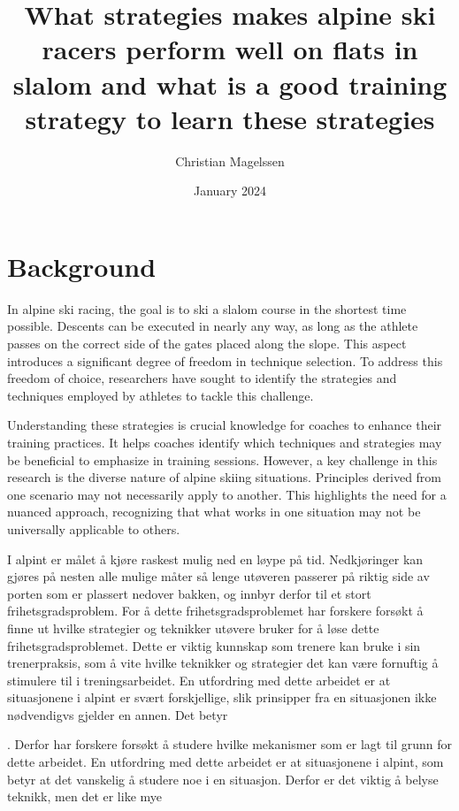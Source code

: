 \documentclass[letterpaper,10pt]{article}
\title{What strategies makes alpine ski racers perform well on flats in slalom and what is a good training strategy to learn these strategies}
\author{Christian Magelssen}
\date{January 2024}
\begin{document}
\maketitle

\section{Background}

In alpine ski racing, the goal is to ski a slalom course in the shortest time possible. Descents can be executed in nearly any way, as long as the athlete passes on the correct side of the gates placed along the slope. This aspect introduces a significant degree of freedom in technique selection. To address this freedom of choice, researchers have sought to identify the strategies and techniques employed by athletes to tackle this challenge.

Understanding these strategies is crucial knowledge for coaches to enhance their training practices. It helps coaches identify which techniques and strategies may be beneficial to emphasize in training sessions. However, a key challenge in this research is the diverse nature of alpine skiing situations. Principles derived from one scenario may not necessarily apply to another. This highlights the need for a nuanced approach, recognizing that what works in one situation may not be universally applicable to others.



I alpint er målet å kjøre raskest mulig ned en løype på tid. Nedkjøringer kan gjøres på nesten alle mulige måter så lenge utøveren passerer på riktig side av porten som er plassert nedover bakken, og innbyr derfor til et stort frihetsgradsproblem. For å dette frihetsgradsproblemet har forskere forsøkt å finne ut hvilke strategier og teknikker utøvere bruker for å løse dette frihetsgradsproblemet. Dette er viktig kunnskap som trenere kan bruke i sin trenerpraksis, som å vite hvilke teknikker og strategier det kan være fornuftig å stimulere til i treningsarbeidet. En utfordring med dette arbeidet er at situasjonene i alpint er svært forskjellige, slik prinsipper fra en situasjonen ikke nødvendigvs gjelder en annen. Det betyr 


. Derfor har forskere forsøkt å studere hvilke mekanismer som er lagt til grunn for dette arbeidet. En utfordring med dette arbeidet er at situasjonene i alpint, som betyr at det vanskelig å studere noe i en situasjon. Derfor er det viktig å belyse teknikk, men det er like mye 
\end{document}
